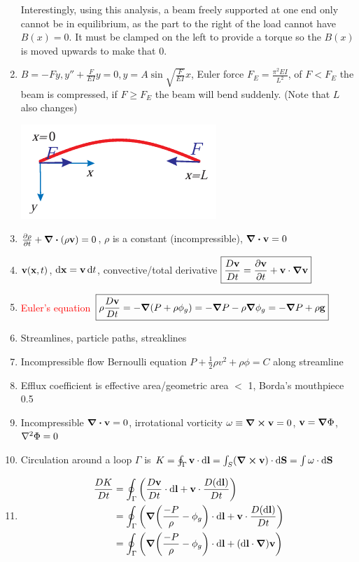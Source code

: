 \documentclass{article}
\theoremstyle{remark}
\theoremstyle{remark}
\begin{document}
\begin{enumerate}
    Interestingly, using this analysis, a beam freely supported at one end only cannot be in equilibrium, as the part to the right of the load cannot have $B(x)=0$. It must be clamped on the left to provide a torque so the $B(x)$ is moved upwards to make that 0.
    \item $B=-Fy,y''+\frac{F}{EI}y=0, y=A\sin\sqrt{\frac{F}{EI}}x$, Euler force $F_E=\frac{\pi^2 EI}{L^2}$, of $F<F_E$ the beam is compressed, if $F\geq F_E$ the beam will bend suddenly. (Note that $L$ also changes)\begin{center}
        \includegraphics[width=0.24\linewidth]{euler_struct.png}
    \end{center}
    \item $\pdv{\rho}{t}+\div(\rho\vb{v}) = 0$, $\rho$ is a constant (incompressible), $\div\vb{v}=0$
    \item $\vb{v}(\vb{x},t)$, $\dd\vb{x}=\vb{v}\dd{t}$, convective/total derivative $\boxed{\frac{D\vb{v}}{D t}=\pdv{\vb{v}}{t}+\vb{v}\cdot\grad\vb{v}}$
    \item \textcolor{red}{Euler's equation} $\boxed{\rho\frac{D\vb{v}}{D t} = -\grad(P+\rho\phi_g) =-\grad P-\rho\grad\phi_g = -\grad P+\rho\vb{g}} $
    \item Streamlines, particle paths, streaklines
    \item Incompressible flow Bernoulli equation $\boxed{P+\frac{1}{2}\rho v^2+\rho\phi=C}$ along streamline
    \item Efflux coefficient is effective area/geometric area $<$ 1, Borda's mouthpiece 0.5
    \item Incompressible $\div\vb{v}=0$, irrotational vorticity $\vb{\omega\equiv\curl\vb{v}} = 0$, $\vb{v}=\grad\Phi$,$\laplacian\Phi=0$
    \item Circulation around a loop $\Gamma$ is $K=\oint_\Gamma\vb{v}\cdot\dd\vb{l}=\int_S(\curl\vb{v})\cdot\dd\vb{S}=\int\omega\cdot\dd\vb{S}$
    \item \begin{align*}\frac{D K}{D t}&=\oint_\Gamma\left(\frac{D\vb{v}}{D t}\cdot\dd\vb{l}+\vb{v}\cdot\frac{D(\dd\vb{l})}{Dt}\right) \\
                &= \oint_\Gamma\left(\grad(\frac{-P}{\rho}-\phi_g)\cdot\dd\vb{l}+\vb{v}\cdot\frac{D(\dd\vb{l})}{Dt}\right)\\
                &= \oint_\Gamma\left(\grad(\frac{-P}{\rho}-\phi_g)\cdot\dd\vb{l}+(\dd\vb{l}\cdot\grad)\vb{v}\right)\\

\end{align*}
\end{enumerate}
\end{document}
